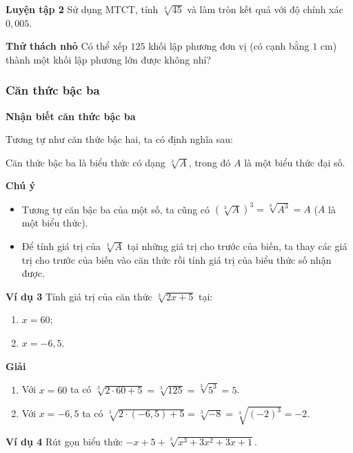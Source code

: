 \begin{lesson}
    \textbf{Luyện tập 2} Sử dụng MTCT, tính $\sqrt[3]{45}$ và làm tròn kết quả với độ chính xác $0,005$.

    \answerline

    \textbf{Thử thách nhỏ} Có thể xếp $125$ khối lập phương đơn vị (có cạnh bằng $1$ cm) thành một khối lập phương lớn được không nhỉ?

    \answerline

    \subsubsection{Căn thức bậc ba}

    \textbf{Nhận biết căn thức bậc ba}

    Tương tự như căn thức bậc hai, ta có định nghĩa sau:

    \begin{keyconcept}
        Căn thức bậc ba là biểu thức có dạng $\sqrt[3]{A}$, trong đó $A$ là một biểu thức đại số.
    \end{keyconcept}

    \textbf{Chú ý}
    \begin{itemize}
        \item Tương tự căn bậc ba của một số, ta cũng có $\left(\sqrt[3]{A}\right)^3=\sqrt[3]{A^3}=A$ ($A$ là một biểu thức).
        \item Để tính giá trị của $\sqrt[3]{A}$ tại những giá trị cho trước của biến, ta thay các giá trị cho trước của biến vào căn thức rồi tính giá trị của biểu thức số nhận được.
    \end{itemize}

    \textbf{Ví dụ 3} Tính giá trị của căn thức $\sqrt[3]{2x+5}$ tại:
    \begin{enumerate}[label=\alph*)]
        \item $x=60$;
        \item $x=-6,5$.
    \end{enumerate}

    \textbf{Giải}
    \begin{enumerate}[label=\alph*)]
        \item Với $x=60$ ta có $\sqrt[3]{2\cdot 60+5}=\sqrt[3]{125}=\sqrt[3]{5^3}=5$.
        \item Với $x=-6,5$ ta có $\sqrt[3]{2\cdot(-6,5)+5}=\sqrt[3]{-8}=\sqrt[3]{(-2)^3}=-2$.
    \end{enumerate}

    \textbf{Ví dụ 4} Rút gọn biểu thức $-x+5+\sqrt[3]{x^3+3x^2+3x+1}$.


\end{lesson}
